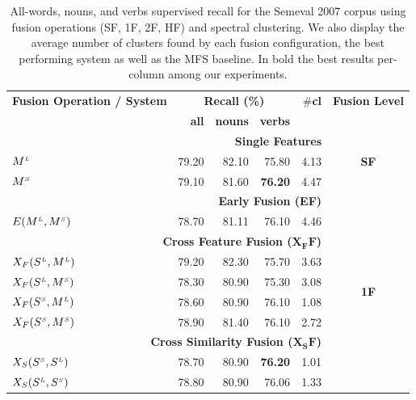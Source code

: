 \begin{table}[htp!]
\centering
\caption{All-words, nouns, and verbs supervised recall for the Semeval 2007 corpus using fusion operations (SF, 1F, 2F, HF) and spectral clustering. We also display the average number of clusters found by each fusion configuration, the best performing system as well as the MFS baseline. In bold the best results per-column among our experiments.}
\label{tab:wsd-semeval_sup_Recall}
\begin{tabular}{@{}lrrrrc@{}}
\toprule
\textbf{Fusion Operation / System} & \multicolumn{3}{c}{\textbf{Recall (\%)}} & \#\textbf{cl} & \textbf{Fusion Level}\\ 
        & \textbf{all}          & \textbf{nouns}          & \textbf{verbs} &          \\ 
       \midrule
        \multicolumn{5}{r}{\textbf{Single Features}} & \multirow{3}{*}{\textbf{SF}} \\ %
       $M^{\scriptscriptstyle L}$                    & 79.20 & 82.10 & 75.80 & 4.13\\
 

       $M^{\scriptscriptstyle S}$                    & 79.10 & 81.60 & \textbf{76.20} & 4.47\\
       \midrule
                   \multicolumn{5}{r}{\textbf{Early Fusion (EF)}}  & \multirow{10}{*}{\textbf{1F}}     \\ %
       $E(M^{\scriptscriptstyle L}, M^{\scriptscriptstyle S})$		& 78.70 & 81.11 & 76.10 & 4.46\\
                   \multicolumn{5}{r}{\textbf{Cross Feature Fusion ($\mathbf{X_FF}$)}}       \\ %
	   
	   $X_F(S^{\scriptscriptstyle L}, M^{\scriptscriptstyle L})$		& 79.20 & 82.30 & 75.70  & 3.63\\	   
       $X_F(S^{\scriptscriptstyle L}, M^{\scriptscriptstyle S})$		& 78.30 & 80.90 & 75.30  & 3.08\\
	   $X_F(S^{\scriptscriptstyle S}, M^{\scriptscriptstyle L})$		& 78.60 & 80.90 & 76.10  & 1.08\\	   
       $X_F(S^{\scriptscriptstyle S}, M^{\scriptscriptstyle S})$		& 78.90 & 81.40 & 76.10 & 2.72\\       
                   \multicolumn{5}{r}{\textbf{Cross Similarity Fusion ($\mathbf{X_SF}$)}}       \\ %
	   
 
	   $X_S(S^{\scriptscriptstyle S}, S^{\scriptscriptstyle L})$		& 78.70 & 80.90 & \textbf{76.20}  & 1.01\\
	   $X_S(S^{\scriptscriptstyle L}, S^{\scriptscriptstyle S})$		& 78.80 & 80.90	& 76.06 & 1.33\\
	  

\end{tabular}
\end{table}
